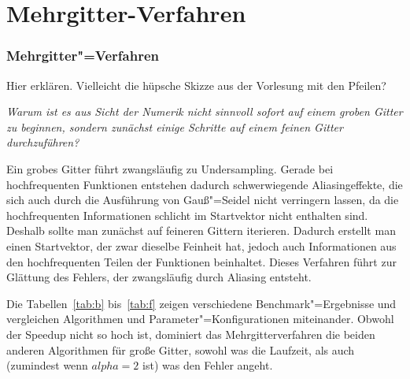\documentclass{beamer}
\begin{document}
\section{Mehrgitter-Verfahren}
\begin{frame}
    \frametitle{Mehrgitter"=Verfahren}
    Hier erklären. Vielleicht die hüpsche Skizze aus der Vorlesung mit den Pfeilen?
\end{frame}








\emph{Warum ist es aus Sicht der Numerik nicht sinnvoll sofort auf einem groben Gitter zu beginnen, sondern zunächst einige Schritte auf einem feinen Gitter durchzuführen?}

Ein grobes Gitter führt zwangsläufig zu Undersampling. Gerade bei hochfrequenten Funktionen entstehen dadurch schwerwiegende Aliasingeffekte, die sich auch durch die Ausführung von Gauß"=Seidel nicht verringern lassen, da die hochfrequenten Informationen schlicht im Startvektor nicht enthalten sind. Deshalb sollte man zunächst auf feineren Gittern iterieren. Dadurch erstellt man einen Startvektor, der zwar dieselbe Feinheit hat, jedoch auch Informationen aus den hochfrequenten Teilen der Funktionen beinhaltet. Dieses Verfahren führt zur Glättung des Fehlers, der zwangsläufig durch Aliasing entsteht.

Die Tabellen~\ref{tab:b} bis~\ref{tab:f} zeigen verschiedene Benchmark"=Ergebnisse und vergleichen Algorithmen und Parameter"=Konfigurationen miteinander. Obwohl der Speedup nicht so hoch ist, dominiert das Mehrgitterverfahren die beiden anderen Algorithmen für große Gitter, sowohl was die Laufzeit, als auch (zumindest wenn \(alpha=2\) ist) was den Fehler angeht.
\end{document}
